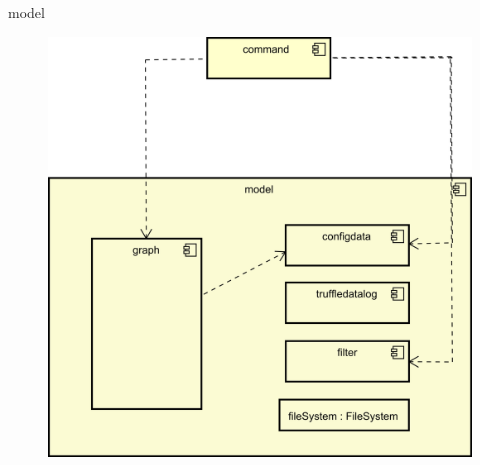 \begin{frame}{model}
  \begin{figure}
    \centering
    \includegraphics[width=\textwidth]{./images/model.png}
  \end{figure}
\end{frame}
